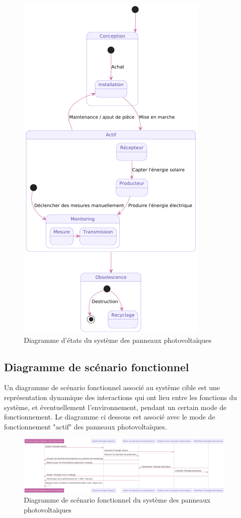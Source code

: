 \documentclass{article}
\begin{document}
\begin{figure}[H]
    \centering
    \includegraphics[height=0.95\textwidth]{diagramme_etat.png}
    \caption{Diagramme d'états du système des panneaux photovoltaïques}
    \label{fig:diagramme_etats}
\end{figure}

\subsection{Diagramme de scénario fonctionnel}
Un diagramme de scénario fonctionnel associé au système cible est une représentation dynamique des interactions qui ont lieu entre les fonctions du système, et éventuellement l'environnement, pendant un certain mode de fonctionnement. Le diagramme ci dessous est associé avec le mode de fonctionnement "actif" des panneaux photovoltaïques. 

\begin{figure}[H]
    \centering
    \includegraphics[width=0.95\textwidth]{diagramme_de_scenario_fonctionnel.png}
    \caption{Diagramme de scénario fonctionnel du système des panneaux photovoltaïques}
    \label{fig:diagramme_scenario_fonctionnel}
\end{figure}
\end{document}
